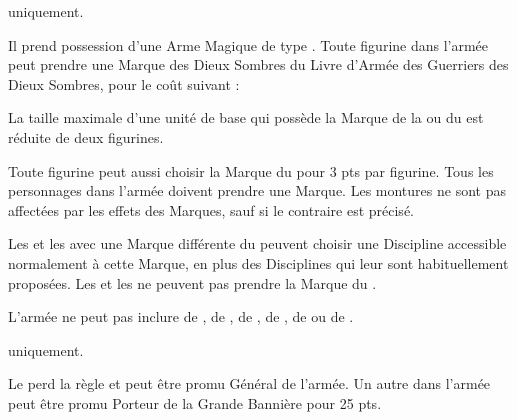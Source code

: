\begin{multicols}{2}
\startpricelistNSP

\greatkhan{} uniquement.

Il prend possession d'une Arme Magique de type \ironfist{}. Toute figurine dans l'armée peut prendre une Marque des Dieux Sombres du Livre d'Armée des Guerriers des Dieux Sombres, pour le coût suivant :

 La taille maximale d'une unité de base qui possède la Marque de la \pestilence{} ou du \wrath{} est réduite de deux figurines.

Toute figurine peut aussi choisir la Marque du \truechaos{} pour 3 pts par figurine. Tous les personnages dans l'armée doivent prendre une Marque. Les montures ne sont pas affectées par les effets des Marques, sauf si le contraire est précisé.

Les \shamans{} et les \greatshamans{} avec une Marque différente du \truechaos{} peuvent choisir une Discipline accessible normalement à cette Marque, en plus des Disciplines qui leur sont habituellement proposées. Les \shamans{} et les \greatshamans{} ne peuvent pas prendre la Marque du \wrath{}.

L'armée ne peut pas inclure de \mammothhunter{}, de \scrapling{}, de \scraplingtrapper{}, de \yeti{}, de \sabretoothtiger{} ou de \scratapult{}.

\vspace*{\fill}\columnbreak
{}\mammothhunter{} uniquement.

Le \mammothhunter{} perd la règle \notaleader{} et peut être promu Général de l'armée. Un autre \mammothhunter{} dans l'armée peut être promu Porteur de la Grande Bannière pour 25 pts.


\end{multicols}
